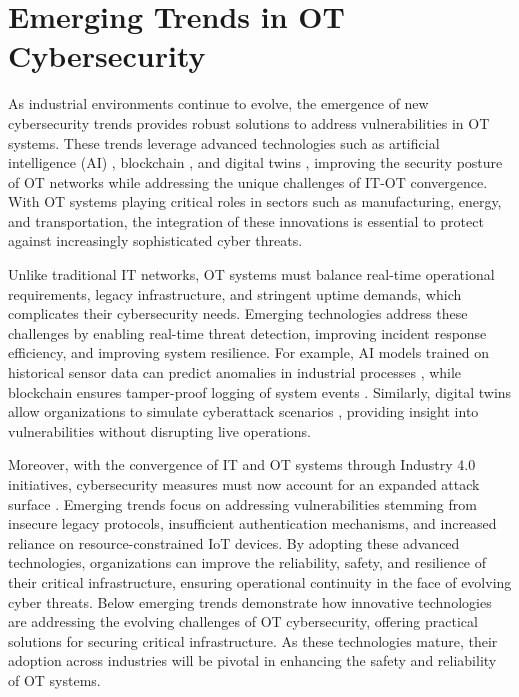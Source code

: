 \section{Emerging Trends in OT Cybersecurity}
\label{sec:EmergingTrends}

As industrial environments continue to evolve, the emergence of new cybersecurity trends provides robust solutions to address vulnerabilities in OT systems. These trends leverage advanced technologies such as artificial intelligence (AI) \cite{sarker2024ai}, blockchain \cite{gimenez2021achieving}, and digital twins \cite{holmes2021digital}, improving the security posture of OT networks while addressing the unique challenges of IT-OT convergence. With OT systems playing critical roles in sectors such as manufacturing, energy, and transportation, the integration of these innovations is essential to protect against increasingly sophisticated cyber threats.

Unlike traditional IT networks, OT systems must balance real-time operational requirements, legacy infrastructure, and stringent uptime demands, which complicates their cybersecurity needs. Emerging technologies address these challenges by enabling real-time threat detection, improving incident response efficiency, and improving system resilience. For example, AI models trained on historical sensor data can predict anomalies in industrial processes \cite{kashpruk2023time}, while blockchain ensures tamper-proof logging of system events \cite{bajramovic2019secure}. Similarly, digital twins allow organizations to simulate cyberattack scenarios \cite{mustofa2024analyzing}, providing insight into vulnerabilities without disrupting live operations.

Moreover, with the convergence of IT and OT systems through Industry 4.0 initiatives, cybersecurity measures must now account for an expanded attack surface \cite{george2024impact}. Emerging trends focus on addressing vulnerabilities stemming from insecure legacy protocols, insufficient authentication mechanisms, and increased reliance on resource-constrained IoT devices. By adopting these advanced technologies, organizations can improve the reliability, safety, and resilience of their critical infrastructure, ensuring operational continuity in the face of evolving cyber threats. Below emerging trends demonstrate how innovative technologies are addressing the evolving challenges of OT cybersecurity, offering practical solutions for securing critical infrastructure. As these technologies mature, their adoption across industries will be pivotal in enhancing the safety and reliability of OT systems.

